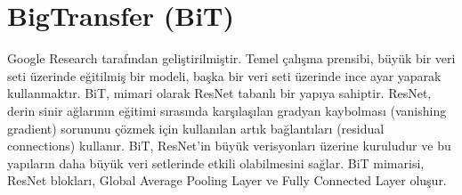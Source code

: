 \section{BigTransfer (BiT)}

Google Research tarafından geliştirilmiştir. Temel çalışma prensibi, büyük bir veri seti üzerinde eğitilmiş bir modeli, başka bir veri seti üzerinde ince ayar yaparak kullanmaktır. BiT, mimari olarak ResNet tabanlı bir yapıya sahiptir. ResNet, derin sinir ağlarının eğitimi sırasında karşılaşılan gradyan kaybolması (vanishing gradient) sorununu çözmek için kullanılan artık bağlantıları (residual connections) kullanır. BiT, ResNet'in büyük verisyonları üzerine kuruludur ve bu yapıların daha büyük veri setlerinde etkili olabilmesini sağlar. BiT mimarisi, ResNet blokları, Global Average Pooling Layer ve Fully Connected Layer oluşur. 

\newpage